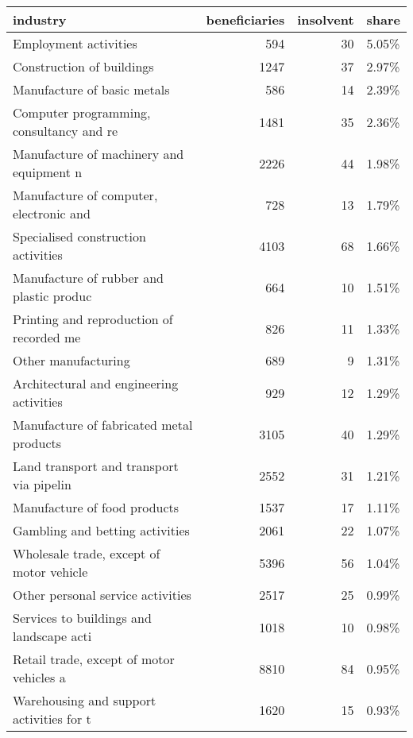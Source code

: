 \begin{tabular}{lrrl}
\toprule
                                industry &  beneficiaries &  insolvent & share \\
\midrule
                   Employment activities &            594 &         30 & 5.05\% \\
               Construction of buildings &           1247 &         37 & 2.97\% \\
             Manufacture of basic metals &            586 &         14 & 2.39\% \\
Computer programming, consultancy and re &           1481 &         35 & 2.36\% \\
Manufacture of machinery and equipment n &           2226 &         44 & 1.98\% \\
Manufacture of computer, electronic and  &            728 &         13 & 1.79\% \\
     Specialised construction activities &           4103 &         68 & 1.66\% \\
Manufacture of rubber and plastic produc &            664 &         10 & 1.51\% \\
Printing and reproduction of recorded me &            826 &         11 & 1.33\% \\
                     Other manufacturing &            689 &          9 & 1.31\% \\
Architectural and engineering activities &            929 &         12 & 1.29\% \\
Manufacture of fabricated metal products &           3105 &         40 & 1.29\% \\
Land transport and transport via pipelin &           2552 &         31 & 1.21\% \\
            Manufacture of food products &           1537 &         17 & 1.11\% \\
         Gambling and betting activities &           2061 &         22 & 1.07\% \\
Wholesale trade, except of motor vehicle &           5396 &         56 & 1.04\% \\
       Other personal service activities &           2517 &         25 & 0.99\% \\
Services to buildings and landscape acti &           1018 &         10 & 0.98\% \\
Retail trade, except of motor vehicles a &           8810 &         84 & 0.95\% \\
Warehousing and support activities for t &           1620 &         15 & 0.93\% \\

\end{tabular}
